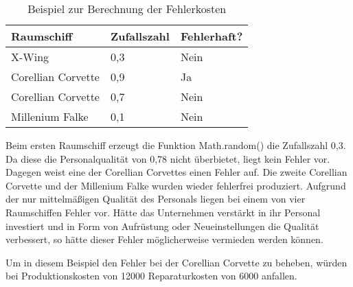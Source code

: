 \medskip

\begin{table}[ht]
     \centering
     \begin{tabular}{ | l | l | l | }
          \hline
          Raumschiff & Zufallszahl & Fehlerhaft? \\
          \hline \hline
          X-Wing & 0,3 & Nein \\ \hline
          Corellian Corvette & 0,9 & Ja \\ \hline
          Corellian Corvette & 0,7 & Nein \\ \hline
          Millenium Falke & 0,1 & Nein \\ \hline
     \end{tabular}
     \caption{Beispiel zur Berechnung der Fehlerkosten}
     \label{tab:spielwelt-logik-fehlerkosten-beispiel}
\end{table}

Beim ersten Raumschiff erzeugt die Funktion Math.random() die Zufallszahl 0,3. Da diese die Personalqualität
von 0,78 nicht überbietet, liegt kein Fehler vor. Dagegen weist eine der Corellian Corvettes einen Fehler auf.
Die zweite Corellian Corvette und der Millenium Falke wurden wieder fehlerfrei produziert.
Aufgrund der nur mittelmäßigen Qualität des Personals liegen bei einem von vier Raumschiffen Fehler vor. Hätte das
Unternehmen verstärkt in ihr Personal investiert und in Form von Aufrüstung oder Neueinstellungen die Qualität verbessert,
so hätte dieser Fehler möglicherweise vermieden werden können.

Um in diesem Beispiel den Fehler bei der Corellian Corvette zu beheben, würden bei Produktionskosten von 12000\curr{}
Reparaturkosten von 6000\curr{} anfallen.